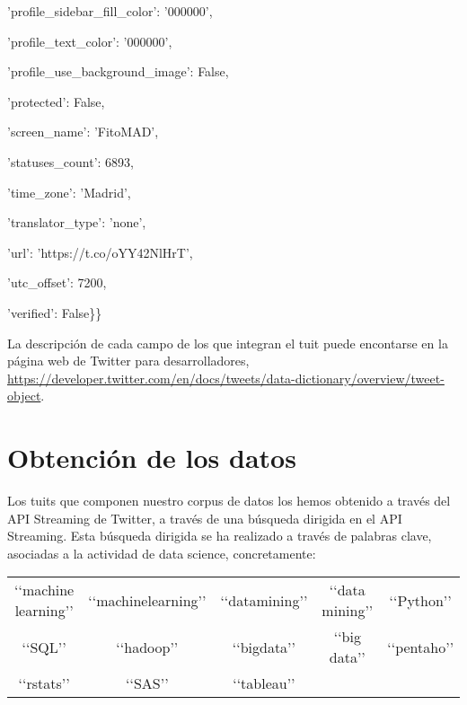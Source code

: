 \hspace{1.7cm}'profile\_sidebar\_fill\_color': '000000',

\hspace{1.7cm}'profile\_text\_color': '000000',

\hspace{1.7cm}'profile\_use\_background\_image': False,

\hspace{1.7cm}'protected': False,

\hspace{1.7cm}'screen\_name': 'FitoMAD',

\hspace{1.7cm}'statuses\_count': 6893,

\hspace{1.7cm}'time\_zone': 'Madrid',

\hspace{1.7cm}'translator\_type': 'none',

\hspace{1.7cm}'url': 'https://t.co/oYY42NlHrT',

\hspace{1.7cm}'utc\_offset': 7200,

\hspace{1.7cm}'verified': False\}\}

\bigskip

La descripción de cada campo de los que integran el tuit puede encontarse en la página web de Twitter para 
desarrolladores, \url{https://developer.twitter.com/en/docs/tweets/data-dictionary/overview/tweet-object}.

\section{Obtenci\'on de los datos}
Los tuits que componen nuestro corpus de datos los hemos obtenido a través del API Streaming
de Twitter, a través de una búsqueda dirigida en el API Streaming. Esta búsqueda dirigida 
se ha realizado a través de palabras clave, asociadas a la actividad de data science, concretamente:

\begin{center}
\begin{tabular}{ccccc}
\lq\lq machine learning\rq\rq  &\lq\lq machinelearning\rq\rq  &\lq\lq datamining\rq\rq  &\lq\lq data mining\rq\rq 
&\lq\lq Python\rq\rq\\
\lq\lq SQL\rq\rq & \lq\lq hadoop\rq\rq  &\lq\lq bigdata\rq\rq  &\lq\lq big data\rq\rq  &\lq\lq pentaho\rq\rq\\
\lq\lq rstats\rq\rq &\lq\lq SAS\rq\rq &\lq\lq tableau\rq\rq
\end{tabular}
\end{center}


